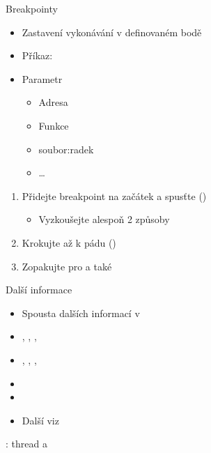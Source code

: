 \fi

\begin{frame}{Breakpointy}

  \begin{itemize}
    \item Zastavení vykonávání v definovaném bodě

    \pause

    \item Příkaz: 
    \item Parametr
    \begin{itemize}
      \item Adresa
      \item Funkce
      \item soubor:radek
      \item \dots
    \end{itemize}
  \end{itemize}

  \pause
  \bigskip

  \begin{enumerate}
    \item Přidejte breakpoint na začátek  a spusťte ()
    \begin{itemize}
      \item Vyzkoušejte alespoň 2 způsoby
    \end{itemize}

    \item Krokujte až k pádu ()
    \item Zopakujte pro  a také 
  \end{enumerate}

\end{frame}

\begin{frame}{Další informace}

  \begin{itemize}
    \item Spousta dalších informací v 
    \item {}, , , 
    \item {}, , , 
    \item {}
    \item {}

    \pause

    \item Další viz 
  \end{itemize}

  \pause
  \medskip

  : thread a \ifpbbin {} \else
     \fi

\end{frame}

